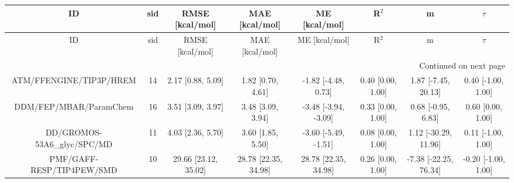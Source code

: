 \documentclass[8pt]{article}
\begin{document}
\begin{center}
\begin{footnotesize}
\begin{longtable}{|cccccccc|}
\toprule
                         ID & sid &      RMSE [kcal/mol] &       MAE [kcal/mol] &        ME [kcal/mol] &             R$^2$ &                     m &              $\tau$ \\
\midrule
\endfirsthead

\toprule
                         ID & sid &      RMSE [kcal/mol] &       MAE [kcal/mol] &        ME [kcal/mol] &             R$^2$ &                     m &              $\tau$ \\
\midrule
\endhead
\midrule
\multicolumn{8}{r}{{Continued on next page}} \\
\midrule
\endfoot

\bottomrule
\endlastfoot
    ATM/FFENGINE/TIP3P/HREM &  14 &    2.17 [0.88, 5.09] &    1.82 [0.70, 4.61] &  -1.82 [-4.48, 0.73] & 0.40 [0.00, 1.00] &   1.87 [-7.45, 20.13] &  0.40 [-1.00, 1.00] \\
     DDM/FEP/MBAR/ParamChem &  16 &    3.51 [3.09, 3.97] &    3.48 [3.09, 3.94] & -3.48 [-3.94, -3.09] & 0.33 [0.00, 1.00] &    0.68 [-0.95, 6.83] &   0.60 [0.00, 1.00] \\
DD/GROMOS-53A6\_glyc/SPC/MD &  11 &    4.03 [2.36, 5.70] &    3.60 [1.85, 5.50] & -3.60 [-5.49, -1.51] & 0.08 [0.00, 1.00] &  1.12 [-30.29, 11.96] &  0.11 [-1.00, 1.00] \\
  PMF/GAFF-RESP/TIP4PEW/SMD &  10 & 29.66 [23.12, 35.02] & 28.78 [22.35, 34.98] & 28.78 [22.35, 34.98] & 0.26 [0.00, 1.00] & -7.38 [-22.25, 76.34] & -0.20 [-1.00, 1.00] \\
\end{longtable}
\end{footnotesize}
\end{center}
\end{document}
